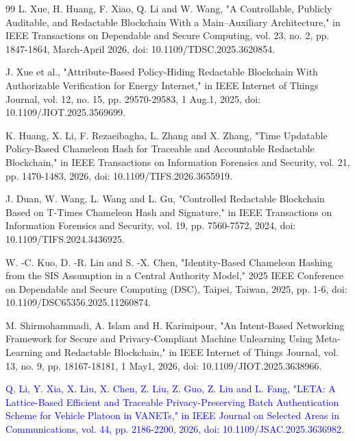 \documentclass[lettersize,journal]{IEEEtran}
\newcommand{\chg}[1]{\textcolor{blue}{#1}}
\begin{document}
\begin{thebibliography}{99}
    L. Xue, H. Huang, F. Xiao, Q. Li and W. Wang, "A Controllable, Publicly Auditable, and Redactable Blockchain With a Main–Auxiliary Architecture," in IEEE Transactions on Dependable and Secure Computing, vol. 23, no. 2, pp. 1847-1864, March-April 2026, doi: 10.1109/TDSC.2025.3620854.
    
    J. Xue et al., "Attribute-Based Policy-Hiding Redactable Blockchain With Authorizable Verification for Energy Internet," in IEEE Internet of Things Journal, vol. 12, no. 15, pp. 29570-29583, 1 Aug.1, 2025, doi: 10.1109/JIOT.2025.3569699.
    
    
    K. Huang, X. Li, F. Rezaeibagha, L. Zhang and X. Zhang, "Time Updatable Policy-Based Chameleon Hash for Traceable and Accountable Redactable Blockchain," in IEEE Transactions on Information Forensics and Security, vol. 21, pp. 1470-1483, 2026, doi: 10.1109/TIFS.2026.3655919.
    
    J. Duan, W. Wang, L. Wang and L. Gu, "Controlled Redactable Blockchain Based on T-Times Chameleon Hash and Signature," in IEEE Transactions on Information Forensics and Security, vol. 19, pp. 7560-7572, 2024, doi: 10.1109/TIFS.2024.3436925. 
    
    W. -C. Kuo, D. -R. Lin and S. -X. Chen, "Identity-Based Chameleon Hashing from the SIS Assumption in a Central Authority Model," 2025 IEEE Conference on Dependable and Secure Computing (DSC), Taipei, Taiwan, 2025, pp. 1-6, doi: 10.1109/DSC65356.2025.11260874.
    
    M. Shirmohammadi, A. Islam and H. Karimipour, "An Intent-Based Networking Framework for Secure and Privacy-Compliant Machine Unlearning Using Meta-Learning and Redactable Blockchain," in IEEE Internet of Things Journal, vol. 13, no. 9, pp. 18167-18181, 1 May1, 2026, doi: 10.1109/JIOT.2025.3638966. 

    \chg{Q. Li, Y. Xia, X. Liu, X. Chen, Z. Liu, Z. Guo, Z. Liu and L. Fang, "LETA: A Lattice-Based Efficient and Traceable Privacy-Preserving Batch Authentication Scheme for Vehicle Platoon in VANETs," in IEEE Journal on Selected Areas in Communications, vol. 44, pp. 2186-2200, 2026, doi: 10.1109/JSAC.2025.3636982.}
    \end{thebibliography}
    
    
\end{document}
